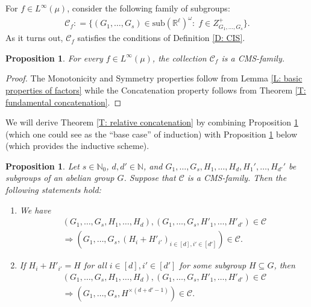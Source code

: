 \documentclass[11pt]{amsart}
\newtheorem{proposition}[lemma]{Proposition}
\theoremstyle{definition}
\newcommand{\N}{{\mathbb N}}
\newcommand{\R}{{\mathbb R}}
\newcommand{\CC}{{\mathcal C}}
\newcommand{\1}{{\mathbf{1}}}
\begin{document}
For $f\in L^\infty(\mu)$, consider the following family of subgroups:
\begin{align*}
    \CC_f \colon= \{(G_1, \ldots, G_s)\in \text{sub}(\R^\ell)^\omega:\; f\in Z^+_{G_1,\ldots, G_s}\}.
\end{align*}
As it turns out, $\CC_f$ satisfies the conditions of Definition \ref{D: CIS}.
\begin{proposition}\label{P: C_f is CIS}
    For every $f\in L^\infty(\mu)$, the collection $\mathcal{C}_{f}$ is a CMS-family. 
\end{proposition}
\begin{proof}
    The Monotonicity and Symmetry properties follow from Lemma \ref{L: basic properties of factors} while the Concatenation property follows from Theorem \ref{T: fundamental concatenation}.
\end{proof}

We will derive Theorem \ref{T: relative concatenation} by combining Proposition \ref{P: C_f is CIS} (which one could see as the ``base case'' of induction) with Proposition \ref{P: CIS induction} below (which provides the inductive scheme).
\begin{proposition}\label{P: CIS induction}
	Let $s\in\N_0$, $d,d'\in\N$, and $G_1, \ldots, G_s, H_1, \ldots, H_d, H_1', \ldots, H_{d'}'$ be subgroups of an abelian group $G$.
    Suppose that $\mathcal{C}$ is a CMS-family. Then the following statements hold:
\begin{enumerate}
    \item We have 
    \begin{gather*}
        (G_{1},\dots,G_{s},H_{1},\dots,H_{d}),(G_{1},\dots,G_{s},H'_{1},\dots,H'_{d'})\in \mathcal{C}\\
        \Rightarrow(G_{1},\dots,G_{s},(H_{i}+H'_{i'})_{i\in[d], i'\in[d']})\in \mathcal{C}.
    \end{gather*}
    \item If $H_{i}+H'_{i'}=H$ for all $i\in[d], i'\in[d']$ for some subgroup $H\subseteq G$, then 
    \begin{gather*}
        (G_1, \ldots, G_s, H_{1},\dots,H_{d}), (G_1, \ldots, G_s, H'_{1},\dots,H'_{d'})\in \mathcal{C}\\
        \Rightarrow (G_1, \ldots, G_s, H^{\times (d+d'-1)})\in \mathcal{C}.
    \end{gather*}
\end{enumerate}
		
%		
\end{proposition}
\end{document}

